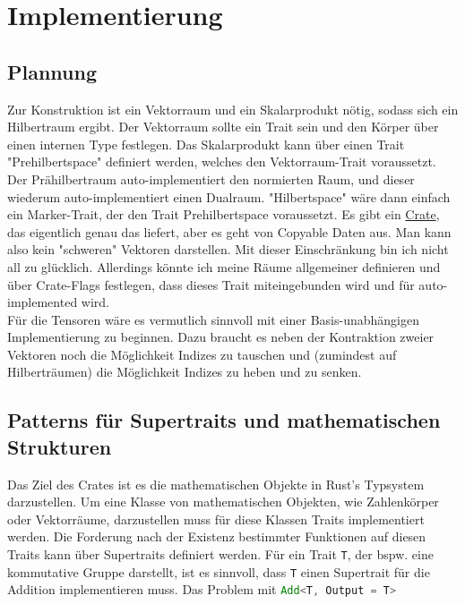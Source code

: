 \documentclass[12pt]{article}
\begin{document}
\section{Implementierung}
\subsection{Plannung}
Zur Konstruktion ist ein Vektorraum und ein Skalarprodukt nötig, sodass sich ein Hilbertraum ergibt. Der Vektorraum sollte ein Trait sein und den Körper über einen internen Type festlegen. Das Skalarprodukt kann über einen Trait "Prehilbertspace" definiert werden, welches den Vektorraum-Trait voraussetzt. Der Prähilbertraum auto-implementiert den normierten Raum, und dieser wiederum auto-implementiert einen Dualraum. "Hilbertspace" wäre dann einfach ein Marker-Trait, der den Trait Prehilbertspace voraussetzt. Es gibt ein \href{https://docs.rs/vector-space/latest/vector_space/index.html}{Crate}, das eigentlich genau das liefert, aber es geht von Copyable Daten aus. Man kann also kein "schweren" Vektoren darstellen. Mit dieser Einschränkung bin ich nicht all zu glücklich. Allerdings könnte ich meine Räume allgemeiner definieren und über Crate-Flags festlegen, dass dieses Trait miteingebunden wird und für auto-implemented wird.\\
Für die Tensoren wäre es vermutlich sinnvoll mit einer Basis-unabhängigen Implementierung zu beginnen. Dazu braucht es neben der Kontraktion zweier Vektoren noch die Möglichkeit Indizes zu tauschen und (zumindest auf Hilberträumen) die Möglichkeit Indizes zu heben und zu senken.

\subsection{Patterns für Supertraits und mathematischen Strukturen}
Das Ziel des Crates ist es die mathematischen Objekte in Rust's Typsystem darzustellen. Um eine Klasse von mathematischen Objekten, wie Zahlenkörper oder Vektorräume, darzustellen muss für diese Klassen Traits implementiert werden. Die Forderung nach der Existenz bestimmter Funktionen auf diesen Traits kann über Supertraits definiert werden. Für ein Trait \texttt T, der bspw. eine kommutative Gruppe darstellt, ist es sinnvoll, dass \texttt T einen Supertrait für die Addition implementieren muss. Das Problem mit \lstinline[language=Rust, morekeywords={T}]{Add<T, Output = T>} %
\end{document}
